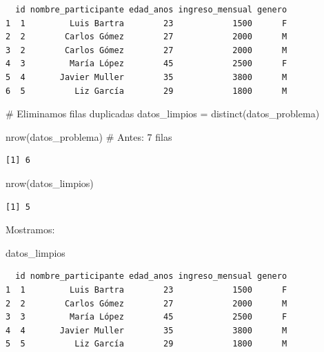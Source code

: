 \documentclass[
  letterpaper,
  DIV=11,
  numbers=noendperiod,
  twoside]{scrreprt}
\newenvironment{Shaded}{\begin{snugshade}}{\end{snugshade}}
\newcommand{\CommentTok}[1]{\textcolor[rgb]{0.37,0.37,0.37}{#1}}
\newcommand{\FunctionTok}[1]{\textcolor[rgb]{0.28,0.35,0.67}{#1}}
\newcommand{\NormalTok}[1]{\textcolor[rgb]{0.00,0.23,0.31}{#1}}
\newcommand{\OtherTok}[1]{\textcolor[rgb]{0.00,0.23,0.31}{#1}}
\begin{document}
\begin{verbatim}
  id nombre_participante edad_anos ingreso_mensual genero
1  1         Luis Bartra        23            1500      F
2  2        Carlos Gómez        27            2000      M
3  2        Carlos Gómez        27            2000      M
4  3         María López        45            2500      F
5  4       Javier Muller        35            3800      M
6  5          Liz García        29            1800      M
\end{verbatim}

\begin{Shaded}
\begin{Highlighting}[]
\CommentTok{\# Eliminamos filas duplicadas}
\NormalTok{datos\_limpios }\OtherTok{=} \FunctionTok{distinct}\NormalTok{(datos\_problema)}
\end{Highlighting}
\end{Shaded}

\begin{Shaded}
\begin{Highlighting}[]
\FunctionTok{nrow}\NormalTok{(datos\_problema)     }\CommentTok{\# Antes: 7 filas}
\end{Highlighting}
\end{Shaded}

\begin{verbatim}
[1] 6
\end{verbatim}

\begin{Shaded}
\begin{Highlighting}[]
\FunctionTok{nrow}\NormalTok{(datos\_limpios) }
\end{Highlighting}
\end{Shaded}

\begin{verbatim}
[1] 5
\end{verbatim}

Mostramos:

\begin{Shaded}
\begin{Highlighting}[]
\NormalTok{datos\_limpios}
\end{Highlighting}
\end{Shaded}

\begin{verbatim}
  id nombre_participante edad_anos ingreso_mensual genero
1  1         Luis Bartra        23            1500      F
2  2        Carlos Gómez        27            2000      M
3  3         María López        45            2500      F
4  4       Javier Muller        35            3800      M
5  5          Liz García        29            1800      M
\end{verbatim}
\end{document}
